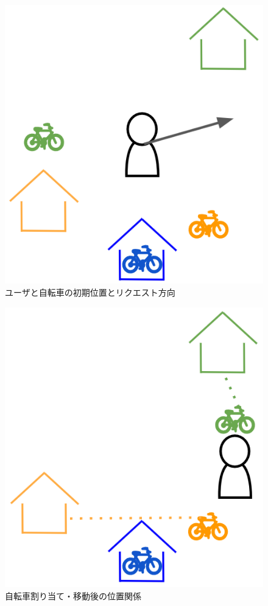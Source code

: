           \begin{figure}[htbp]
            \centering
            \includegraphics[scale=0.6]
            {figures/subjectFunction1-0.png}
            \caption{ユーザと自転車の初期位置とリクエスト方向}
            \label{fig:ユーザと自転車の初期位置とリクエスト方向}
          \end{figure}
          \begin{figure}[htbp]
            \centering
            \includegraphics[scale=0.6]
            {figures/subjectFunction1-1.png}
            \caption{自転車割り当て・移動後の位置関係}
            \label{fig:自転車割り当て・移動後の位置関係}
          \end{figure}
          
